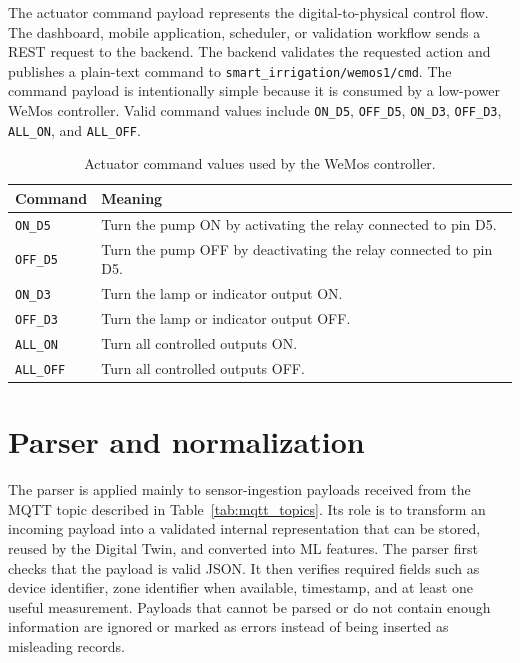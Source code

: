 The actuator command payload represents the digital-to-physical control flow. The dashboard, mobile application, scheduler, or validation workflow sends a REST request to the backend. The backend validates the requested action and publishes a plain-text command to \texttt{smart\_irrigation/wemos1/cmd}. The command payload is intentionally simple because it is consumed by a low-power WeMos controller. Valid command values include \texttt{ON\_D5}, \texttt{OFF\_D5}, \texttt{ON\_D3}, \texttt{OFF\_D3}, \texttt{ALL\_ON}, and \texttt{ALL\_OFF}.

\begin{table}[H]
\centering
\caption{Actuator command values used by the WeMos controller.}
\label{tab:wemos_command_values}
\begin{tabular}{p{}p{}}
\hline
\textbf{Command} & \textbf{Meaning} \\
\hline
\texttt{ON\_D5} & Turn the pump ON by activating the relay connected to pin D5. \\
\texttt{OFF\_D5} & Turn the pump OFF by deactivating the relay connected to pin D5. \\
\texttt{ON\_D3} & Turn the lamp or indicator output ON. \\
\texttt{OFF\_D3} & Turn the lamp or indicator output OFF. \\
\texttt{ALL\_ON} & Turn all controlled outputs ON. \\
\texttt{ALL\_OFF} & Turn all controlled outputs OFF. \\
\hline
\end{tabular}
\end{table}

\section{Parser and normalization}

The parser is applied mainly to sensor-ingestion payloads received from the MQTT topic described in Table~\ref{tab:mqtt_topics}. Its role is to transform an incoming payload into a validated internal representation that can be stored, reused by the Digital Twin, and converted into ML features. The parser first checks that the payload is valid JSON. It then verifies required fields such as device identifier, zone identifier when available, timestamp, and at least one useful measurement. Payloads that cannot be parsed or do not contain enough information are ignored or marked as errors instead of being inserted as misleading records.

